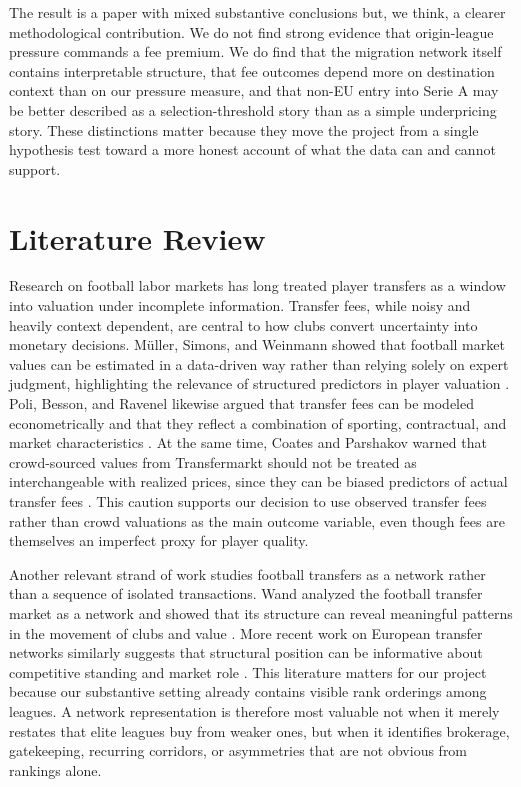 \documentclass[12pt]{article}
\begin{document}
The result is a paper with mixed substantive conclusions but, we think, a clearer methodological contribution. We do not find strong evidence that origin-league pressure commands a fee premium. We do find that the migration network itself contains interpretable structure, that fee outcomes depend more on destination context than on our pressure measure, and that non-EU entry into Serie A may be better described as a selection-threshold story than as a simple underpricing story. These distinctions matter because they move the project from a single hypothesis test toward a more honest account of what the data can and cannot support.

\section*{Literature Review}

Research on football labor markets has long treated player transfers as a window into valuation under incomplete information. Transfer fees, while noisy and heavily context dependent, are central to how clubs convert uncertainty into monetary decisions. M\"uller, Simons, and Weinmann showed that football market values can be estimated in a data-driven way rather than relying solely on expert judgment, highlighting the relevance of structured predictors in player valuation \cite{muller2017}. Poli, Besson, and Ravenel likewise argued that transfer fees can be modeled econometrically and that they reflect a combination of sporting, contractual, and market characteristics \cite{poli2022}. At the same time, Coates and Parshakov warned that crowd-sourced values from Transfermarkt should not be treated as interchangeable with realized prices, since they can be biased predictors of actual transfer fees \cite{coates2022}. This caution supports our decision to use observed transfer fees rather than crowd valuations as the main outcome variable, even though fees are themselves an imperfect proxy for player quality.

Another relevant strand of work studies football transfers as a network rather than a sequence of isolated transactions. Wand analyzed the football transfer market as a network and showed that its structure can reveal meaningful patterns in the movement of clubs and value \cite{wand2022}. More recent work on European transfer networks similarly suggests that structural position can be informative about competitive standing and market role \cite{dieles2024}. This literature matters for our project because our substantive setting already contains visible rank orderings among leagues. A network representation is therefore most valuable not when it merely restates that elite leagues buy from weaker ones, but when it identifies brokerage, gatekeeping, recurring corridors, or asymmetries that are not obvious from rankings alone.
\end{document}
